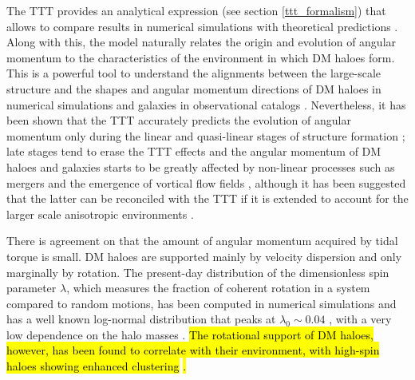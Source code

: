 \documentclass[fleqn,usenatbib]{mnras}
\begin{document}
The TTT provides an analytical expression (see section \ref{ttt_formalism}) that allows to compare results in numerical simulations with theoretical predictions \citep{white1984,hoffman1986,barnesyefstathiou1987,heavensypeacock1988,sugermanetal2000,leeypen2000,porcianietal2002a}. Along with this, the model naturally relates the origin and evolution of angular momentum to the characteristics of the environment in which DM haloes form. This is a powerful tool to understand the alignments between the large-scale structure and the shapes and angular momentum directions of DM haloes in numerical simulations \citep{bailinysteinmetz2005,aragoncalvoetal2007,hahnetal2007,libeskindetal2012,foreroromeroetal2014} and galaxies in observational catalogs \citep{leeyerdogdu2007,pazetal2008,tempelylibeskind2013,zhangetal2015}. Nevertheless, it has been shown that the TTT accurately predicts the evolution of angular momentum only during the linear and quasi-linear stages of structure formation \citep{sugermanetal2000,porcianietal2002a}; late stages tend to erase the TTT effects and the angular momentum of DM haloes and galaxies starts to be greatly affected by non-linear processes such as mergers \citep{vitvitskaetal2002,bettyfrenk2016} and the emergence of vortical flow fields \citep{libeskindetal2012}, although it has been suggested that the latter can be reconciled with the TTT if it is extended to account for the larger scale anisotropic environments \citep{codisetal2015,laigleetal2015}.

There is agreement on that the amount of angular momentum acquired by tidal torque is small. DM haloes are supported mainly by velocity dispersion and only marginally by rotation. The present-day distribution of the dimensionless spin parameter $\lambda$, which measures the fraction of coherent rotation in a system compared to random motions, has been computed in numerical simulations and has a well known log-normal distribution that peaks at $\lambda_{0}\sim 0.04$ \citep{bullocketal2001,bailinysteinmetz2005,bettetal2007}, with a very low dependence on the halo masses \citep{vitvitskaetal2002}. \hl{The rotational support of DM haloes, however, has been found to correlate with their environment, with high-spin haloes showing enhanced clustering} \citep{gaoywhite2007,faltenbacherywhite2010}\hl{.}
\end{document}
